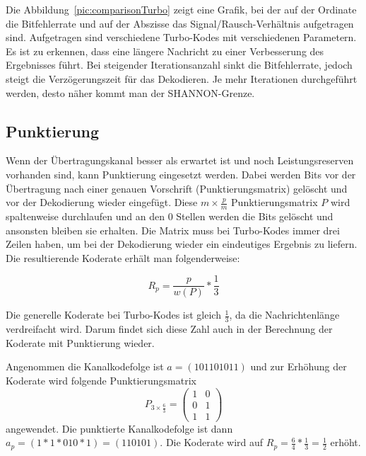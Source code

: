 Die Abbildung~\ref{pic:comparisonTurbo} zeigt eine Grafik, bei der auf der Ordinate die Bitfehlerrate und auf der Abszisse das Signal/Rausch-Verhältnis  aufgetragen sind. Aufgetragen sind verschiedene Turbo-Kodes mit verschiedenen Parametern. Es ist zu erkennen, dass eine längere Nachricht zu einer Verbesserung des Ergebnisses führt. Bei steigender Iterationsanzahl sinkt die Bitfehlerrate, jedoch steigt die Verzögerungszeit für das Dekodieren. Je mehr Iterationen durchgeführt werden, desto näher kommt man der SHANNON-Grenze.

\FloatBarrier
\subsection{Punktierung}
\label{sec:puncturing}
Wenn der Übertragungskanal besser als erwartet ist und noch Leistungsreserven vorhanden sind, kann Punktierung eingesetzt werden. Dabei werden Bits vor der Übertragung nach einer genauen Vorschrift (Punktierungsmatrix) gelöscht und vor der Dekodierung wieder eingefügt. Diese $m \times \frac{p}{m}$ Punktierungsmatrix $P$  wird spaltenweise durchlaufen und an den 0 Stellen werden die Bits gelöscht und ansonsten bleiben sie erhalten. Die Matrix muss bei Turbo-Kodes immer drei Zeilen haben, um bei der Dekodierung wieder ein eindeutiges Ergebnis zu liefern. Die resultierende Koderate erhält man folgenderweise:

\begin{equation}
R_p = \frac{p}{w(P)} * \frac{1}{3}
\end{equation} 

Die generelle Koderate bei Turbo-Kodes ist gleich $\frac{1}{3}$, da die Nachrichtenlänge verdreifacht wird. Darum findet sich diese Zahl auch in der Berechnung der Koderate mit Punktierung wieder.~\cite[218]{schoenfeld2012informations}

\begin{e_exa}
Angenommen die Kanalkodefolge ist $a=(101101011)$ und zur Erhöhung der Koderate wird folgende Punktierungsmatrix $$P_{3 \times \frac{6}{3}}=\begin{pmatrix}
1 & 0 \\
0 & 1 \\
1 & 1
\end{pmatrix}$$ angewendet. Die punktierte Kanalkodefolge ist dann $a_p=(1*1*010*1)=(110101)$. Die Koderate wird auf $R_p = \frac{6}{4} * \frac{1}{3} = \frac{1}{2}$ erhöht. 
\end{e_exa}